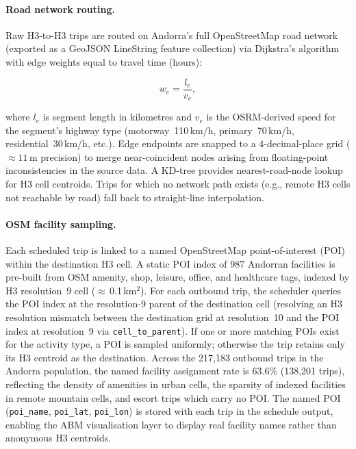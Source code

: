 \documentclass[a4paper,12pt]{article}
\begin{document}
\paragraph{Road network routing.}
Raw H3-to-H3 trips are routed on Andorra's full OpenStreetMap road network
(exported as a GeoJSON LineString feature collection) via Dijkstra's
algorithm with edge weights equal to travel time (hours):

\begin{equation}
  w_e = \frac{l_e}{v_e},
  \label{eq:edge_weight}
\end{equation}

where $l_e$ is segment length in kilometres and $v_e$ is the OSRM-derived
speed for the segment's highway type (motorway~110\,km/h, primary~70\,km/h,
residential~30\,km/h, etc.). Edge endpoints are snapped to a 4-decimal-place
grid ($\approx11$\,m precision) to merge near-coincident nodes arising from
floating-point inconsistencies in the source data. A KD-tree provides
nearest-road-node lookup for H3 cell centroids. Trips for which no network
path exists (e.g., remote H3 cells not reachable by road) fall back to
straight-line interpolation.

\paragraph{OSM facility sampling.}
Each scheduled trip is linked to a named OpenStreetMap point-of-interest (POI)
within the destination H3 cell. A static POI index of 987 Andorran facilities
is pre-built from OSM amenity, shop, leisure, office, and healthcare tags,
indexed by H3 resolution~9 cell ($\approx$\,0.1\,km$^2$). For each outbound
trip, the scheduler queries the POI index at the resolution-9 parent of the
destination cell (resolving an H3 resolution mismatch between the destination
grid at resolution~10 and the POI index at resolution~9 via
\texttt{cell\_to\_parent}). If one or more matching POIs exist for the activity
type, a POI is sampled uniformly; otherwise the trip retains only its H3
centroid as the destination. Across the 217,183 outbound trips in the Andorra
population, the named facility assignment rate is 63.6\% (138,201 trips),
reflecting the density of amenities in urban cells, the sparsity of indexed
facilities in remote mountain cells, and escort trips which carry no POI. The named POI
(\texttt{poi\_name}, \texttt{poi\_lat}, \texttt{poi\_lon}) is stored with each
trip in the schedule output, enabling the ABM visualisation layer to display
real facility names rather than anonymous H3 centroids.
\end{document}
